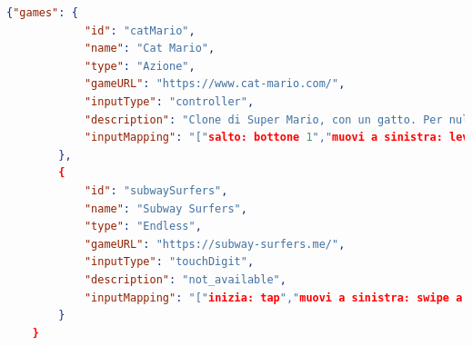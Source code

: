 \begin{lstlisting}[language=json,firstnumber=1]
    {"games": {
            "id": "catMario",
            "name": "Cat Mario",
            "type": "Azione",
            "gameURL": "https://www.cat-mario.com/",
            "inputType": "controller",
            "description": "Clone di Super Mario, con un gatto. Per nulla stressante!",
            "inputMapping": "["salto: bottone 1","muovi a sinistra: leva D-Pad sinistra","muovi a destra: leva D-Pad destra"]"
        },
        {
            "id": "subwaySurfers",
            "name": "Subway Surfers",
            "type": "Endless",
            "gameURL": "https://subway-surfers.me/",
            "inputType": "touchDigit",
            "description": "not_available",
            "inputMapping": "["inizia: tap","muovi a sinistra: swipe a sinistra","muovi a destra: swipe a destra","salto: swipe in alto","rotolata:swipe in basso"]"
        }
    }
\end{lstlisting}
